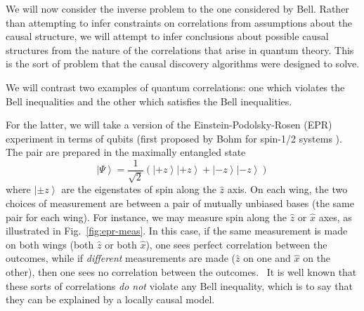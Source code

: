 \documentclass[letterpaper,onecolumn,nofootinbib]{revtex4}
\begin{document}
We will now consider the inverse problem to the one considered by
Bell. Rather than attempting to infer constraints on correlations from
assumptions about the causal structure, we will attempt to infer conclusions
about possible causal structures from the nature of the correlations that arise in quantum theory. This is the sort of problem that the causal discovery
algorithms were designed to solve.

We will contrast two examples of quantum correlations: one which violates
the Bell inequalities and the other which satisfies the Bell inequalities.

For the latter, we will take a version of the Einstein-Podolsky-Rosen (EPR)
experiment \cite{Einstein1935} in terms of qubits (first proposed by Bohm for spin-1/2 systems \cite{Bohmtextbook}).
The pair are prepared in the maximally entangled state
\begin{equation}
\left\vert \Psi \right\rangle =\frac{1}{\sqrt{2}}\left( \left\vert +z\right\rangle \left\vert
+z\right\rangle +\left\vert -z\right\rangle \left\vert -z\right\rangle
\right)
\label{eqn:maxent}
\end{equation}
where $\left\vert \pm z\right\rangle $ are the eigenstates of
spin along the $\hat{z}$ axis. On each wing, the two choices of measurement
are between a pair of mutually unbiased bases (the same pair for each wing).  For instance, we may measure spin along the $\hat{z}$ or $\hat{x}$ axes, as illustrated
in Fig.~\ref{fig:epr-meas}. In this case, if the same measurement is made on both wings
(both $\hat{z}$ or both $\hat{x}$), one sees perfect correlation between the
outcomes, while if \emph{different }measurements are made ($\hat{z}$ on one
and $\hat{x}$ on the other), then one sees no correlation between the
outcomes.   \ It is well known that these sorts of correlations \emph{do not
}violate any Bell inequality, which is to say that they can be explained by
a locally causal model.
\end{document}
